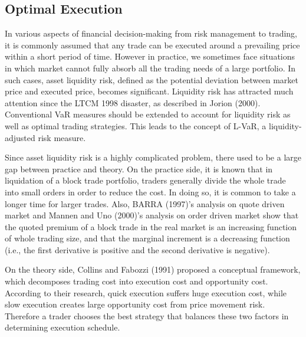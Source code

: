 \subsection{Optimal Execution}\label{subsec_r33}
In various aspects of financial decision-making from risk management to trading, it is commonly assumed that any trade can be executed around a prevailing price within a short period of time.  However in practice, we sometimes face situations in which market cannot fully absorb all the trading needs of a large portfolio.  In such cases, asset liquidity risk, defined as the potential deviation between market price and executed price, becomes significant.  Liquidity risk has attracted much attention since the LTCM 1998 disaster, as described in Jorion (2000).  Conventional VaR measures should be extended to account for liquidity risk as well as optimal trading strategies.  This leads to the concept of L-VaR, a liquidity-adjusted risk measure. 

Since asset liquidity risk is a highly complicated problem, there used to be a large gap between practice and theory.  On the practice side, it is known that in liquidation of a block trade portfolio, traders generally divide the whole trade into small orders in order to reduce the cost.  In doing so, it is common to take a longer time for larger trades.  Also, BARRA (1997)'s analysis on quote driven market and Mannen and Uno (2000)'s analysis on order driven market show that the quoted premium of a block trade in the real market is an increasing function of whole trading size, and that the marginal increment is a decreasing function (i.e., the first derivative is positive and the second derivative is negative).  

On the theory side, Collins and Fabozzi (1991) proposed a conceptual framework, which decomposes trading cost into execution cost and opportunity cost.  According to their research, quick execution suffers huge execution cost, while slow execution creates large opportunity cost from price movement risk.  Therefore a trader chooses the best strategy that balances these two factors in determining execution schedule.

